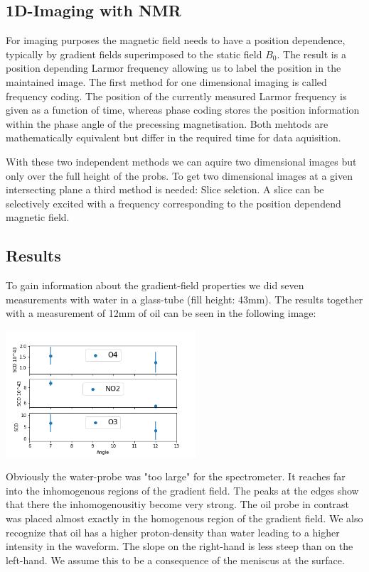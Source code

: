 \documentclass[12pt, english]{scrartcl} %
\begin{document}
\begin{multicols}{2}
\newpage



\section{1D-Imaging with NMR}

For imaging purposes the magnetic field needs to have a position dependence, typically by gradient fields superimposed to the static field $B_0$. The result is a position depending Larmor frequency allowing us to label the position in the maintained image. 
The first method for one dimensional imaging is called frequency coding. The position of the currently measured Larmor frequency is given as a function of time, whereas phase coding stores the position information within the phase angle of the precessing magnetisation. Both mehtods are mathematically equivalent but differ in the required time for data aquisition.

With these two independent methods we can aquire two dimensional images but only over the full height of the probs. To get two dimensional images at a given intersecting plane a third method is needed: Slice selction. A slice can be selectively excited with a frequency corresponding to the position dependend magnetic field.


\subsection{Results}

To gain information about the gradient-field properties we did seven measurements with water in a glass-tube (fill height: 43mm). The results together with a measurement of 12mm of oil can be seen in the following image:

\begin{center}
\includegraphics[width=200pt]{graphics/SCD_angle.png}
\label{peanut}
\end{center}

Obviously the water-probe was "too large" for the spectrometer. It reaches far into the inhomogenous regions of the gradient field. The peaks at the edges show that there the inhomogenousitiy become very strong. The oil probe in contrast was placed almost exactly in the homogenous region of the gradient field. We also recognize that oil has a higher proton-density than water leading to a higher intensity in the waveform. The slope on the right-hand is less steep than on the left-hand. We assume this to be a consequence of the meniscus at the surface.


\end{multicols}
\end{document}

